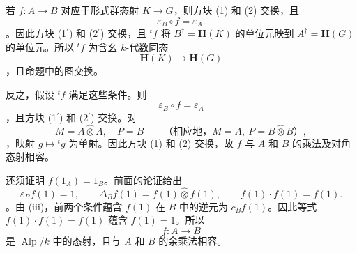 若 \(f:A\to B\) 对应于形式群态射 \(K\to G\)，则方块 \textup{(1)} 和 \textup{(2)} 交换，且 \[
  \varepsilon_B\circ f=\varepsilon_A.
\]。因此方块 \textup{(1\(^{\prime}\))} 和 \textup{(2\(^{\prime}\))} 交换，且 \({}^t f\) 将 \(B^\dagger=\mathbf H(K)\) 的单位元映到 \(A^\dagger=\mathbf H(G)\) 的单位元。所以 \({}^t f\) 为含幺 \(k\)-代数同态 \[
  \mathbf H(K)\longrightarrow\mathbf H(G)
\]，且命题中的图交换。

反之，假设 \({}^t f\) 满足这些条件。则 \[
  \varepsilon_B\circ f=\varepsilon_A
\]，且方块 \textup{(1\(^{\prime}\))} 和 \textup{(2\(^{\prime}\))} 交换。对 \[
  M=A\widehat\otimes A,\quad P=B
  \qquad
  \text{（相应地，\(M=A,\ P=B\widehat\otimes B\)）},
\]，映射 \(g\mapsto{}^t g\) 为单射。因此方块 \textup{(1)} 和 \textup{(2)} 交换，故 \(f\) 与 \(A\) 和 \(B\) 的乘法及对角态射相容。

还须证明 \(f(1_A)=1_B\)。前面的论证给出 \[
  \varepsilon_B f(1)=1,
  \qquad
  \Delta_B f(1)=f(1)\widehat\otimes f(1),
  \qquad
  f(1)\cdot f(1)=f(1).
\]。由 \textup{(iii)}，前两个条件蕴含 \(f(1)\) 在 \(B\) 中的逆元为 \(c_Bf(1)\)。因此等式 \(f(1)\cdot f(1)=f(1)\) 蕴含 \(f(1)=1\)。所以 \[
  f:A\longrightarrow B
\] 是 \(\operatorname{Alp}/k\) 中的态射，且与 \(A\) 和 \(B\) 的余乘法相容。
